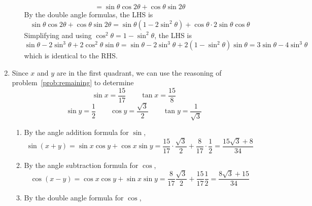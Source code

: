 \documentclass{article}
\newcommand{\ds}{\displaystyle}
\begin{document}
\begin{enumerate}
\begin{enumerate}
\begin{equation*}
      = \sin\theta \cos 2\theta + \cos\theta \sin 2\theta
    \end{equation*}
    By the double angle formulas, the LHS is
    \begin{equation*}
      \sin\theta\cos 2\theta + \cos \theta\sin 2\theta
      = \sin\theta (1-2\sin^2\theta) + \cos\theta \cdot
      2\sin\theta\cos\theta
    \end{equation*}
    Simplifying and using $\cos^2\theta=1-\sin^2\theta$, the LHS is
    \begin{equation*}
      \sin\theta - 2\sin^3\theta + 2\cos^2\theta \sin \theta
      = \sin\theta -2\sin^3\theta + 2(1-\sin^2\theta)\sin\theta
      = 3\sin\theta - 4\sin^3\theta
    \end{equation*}
    which is identical to the RHS.
  \end{enumerate}
\item %
  Since $x$ and $y$ are in the first quadrant, we can use the
  reasoning of problem~\ref{prob:remaining} to determine
  \begin{equation*}
    \sin x = \frac{15}{17} \qquad \tan x = \frac{15}{8}
  \end{equation*}
  \begin{equation*}
    \sin y = \frac{1}{2} \qquad \cos y = \frac{\sqrt{3}}{2}
    \qquad \tan y = \frac{1}{\sqrt{3}}
  \end{equation*}
  \begin{enumerate}
  \item %
    By the angle addition formula for $\sin$,
    \begin{equation*}
      \sin (x+y) = \sin x \cos y + \cos x \sin y
      = \frac{15}{17} \cdot \frac{\sqrt{3}}{2} + \frac{8}{17} \cdot
      \frac{1}{2}
      = \frac{15\sqrt{3}+8}{34}
    \end{equation*}
  \item %
    By the angle subtraction formula for $\cos$,
    \begin{equation*}
      \cos(x-y) = \cos x \cos y + \sin x \sin y
      = \frac{8}{17} \frac{\sqrt{3}}{2} + \frac{15}{17} \frac{1}{2}
      = \frac{8\sqrt{3}+15}{34}
    \end{equation*}
  \item %
    By the double angle formula for $\cos$,
    \begin{equation*}

\end{equation*}
\end{enumerate}
\end{enumerate}
\end{document}
